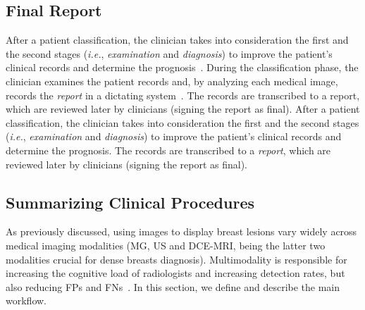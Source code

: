 
\subsection{Final Report}
\label{sec:sec002005003}

After a patient classification, the clinician takes into consideration the first and the second stages ({\it i.e.}, {\it examination} and {\it diagnosis}) to improve the patient's clinical records and determine the prognosis~\cite{segrelles2017increasing}.
During the classification phase, the clinician examines the patient records and, by analyzing each medical image, records the {\it report} in a dictating system~\cite{SENG202079}.
The records are transcribed to a report, which are reviewed later by clinicians (signing the report as final).
After a patient classification, the clinician takes into consideration the first and the second stages ({\it i.e.}, {\it examination} and {\it diagnosis}) to improve the patient's clinical records and determine the prognosis.
The records are transcribed to a {\it report}, which are reviewed later by clinicians (signing the report as final).

\subsection{Summarizing Clinical Procedures}
\label{sec:sec002005004}

As previously discussed, using images to display breast lesions vary widely across medical imaging modalities (\ac{MG}, \ac{US} and \ac{DCE}-\ac{MRI}, being the latter two modalities crucial for dense breasts diagnosis).
Multimodality is responsible for increasing the cognitive load of radiologists and increasing detection rates, but also reducing \acp{FP} and \acp{FN}~\cite{cheung2017integral}.
In this section, we define and describe the main workflow.

